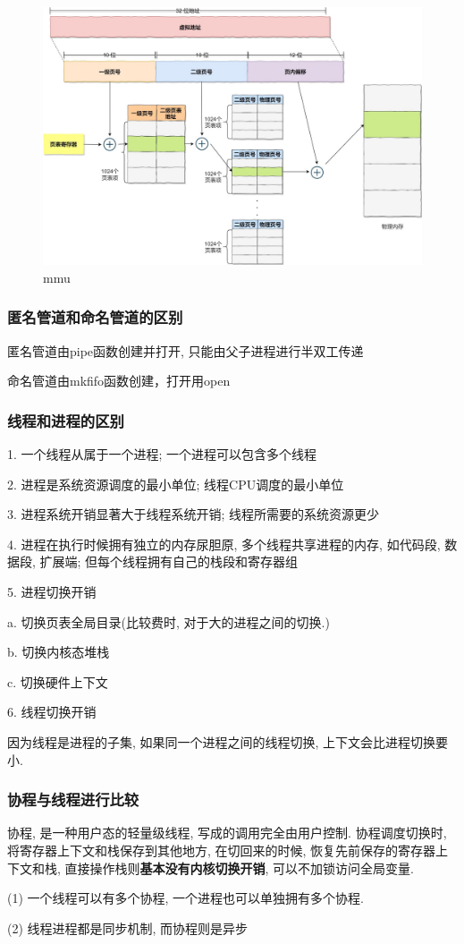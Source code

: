 \begin{figure}
	\centering
	\includegraphics[width=0.7\linewidth]{figures/mmu.jpg}
	\caption{mmu}
	\label{fig:mmu}
\end{figure}

\subsubsection{匿名管道和命名管道的区别}
匿名管道由pipe函数创建并打开, 只能由父子进程进行半双工传递

命名管道由mkfifo函数创建，打开用open


\subsubsection{线程和进程的区别}
1. 一个线程从属于一个进程; 一个进程可以包含多个线程

2. 进程是系统资源调度的最小单位; 线程CPU调度的最小单位

3. 进程系统开销显著大于线程系统开销; 线程所需要的系统资源更少

4. 进程在执行时候拥有独立的内存尿胆原, 多个线程共享进程的内存, 如代码段, 数据段, 扩展端; 但每个线程拥有自己的栈段和寄存器组

5. 进程切换开销

a. 切换页表全局目录(比较费时, 对于大的进程之间的切换.)

b. 切换内核态堆栈

c. 切换硬件上下文

6. 线程切换开销

因为线程是进程的子集, 如果同一个进程之间的线程切换, 上下文会比进程切换要小.
\subsubsection{协程与线程进行比较}
协程, 是一种用户态的轻量级线程, 写成的调用完全由用户控制. 协程调度切换时, 将寄存器上下文和栈保存到其他地方, 在切回来的时候, 恢复先前保存的寄存器上下文和栈, 直接操作栈则\textbf{基本没有内核切换开销}, 可以不加锁访问全局变量. \par
(1) 一个线程可以有多个协程, 一个进程也可以单独拥有多个协程. \par
(2) 线程进程都是同步机制, 而协程则是异步 \par

